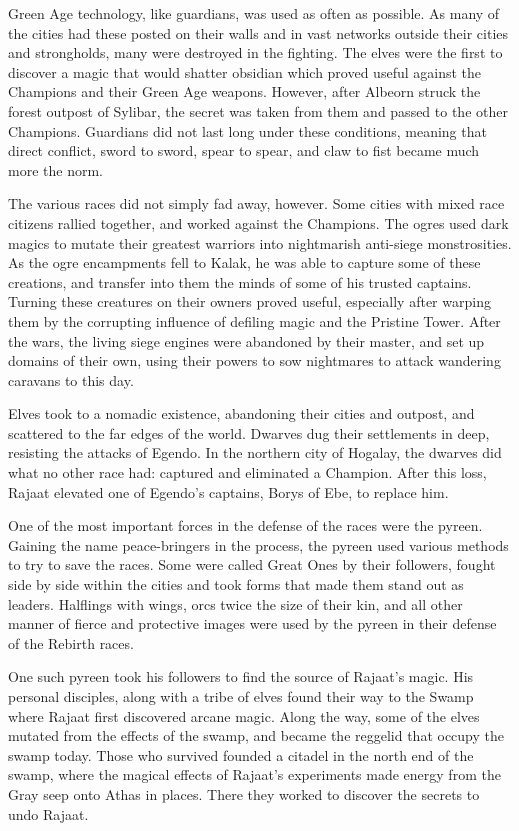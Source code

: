 Green Age technology, like guardians, was used as often as possible. As many of the cities had these posted on their walls and in vast networks outside their cities and strongholds, many were destroyed in the fighting. The elves were the first to discover a magic that would shatter obsidian which proved useful against the Champions and their Green Age weapons. However, after Albeorn struck the forest outpost of Sylibar, the secret was taken from them and passed to the other Champions. Guardians did not last long under these conditions, meaning that direct conflict, sword to sword, spear to spear, and claw to fist became much more the norm.

The various races did not simply fad away, however. Some cities with mixed race citizens rallied together, and worked against the Champions. The ogres used dark magics to mutate their greatest warriors into nightmarish anti-siege monstrosities. As the ogre encampments fell to Kalak, he was able to capture some of these creations, and transfer into them the minds of some of his trusted captains. Turning these creatures on their owners proved useful, especially after warping them by the corrupting influence of defiling magic and the Pristine Tower. After the wars, the living siege engines were abandoned by their master, and set up domains of their own, using their powers to sow nightmares to attack wandering caravans to this day.

Elves took to a nomadic existence, abandoning their cities and outpost, and scattered to the far edges of the world. Dwarves dug their settlements in deep, resisting the attacks of Egendo. In the northern city of Hogalay, the dwarves did what no other race had: captured and eliminated a Champion. After this loss, Rajaat elevated one of Egendo's captains, Borys of Ebe, to replace him.

One of the most important forces in the defense of the races were the pyreen. Gaining the name peace-bringers in the process, the pyreen used various methods to try to save the races. Some were called Great Ones by their followers, fought side by side within the cities and took forms that made them stand out as leaders. Halflings with wings, orcs twice the size of their kin, and all other manner of fierce and protective images were used by the pyreen in their defense of the Rebirth races.

One such pyreen took his followers to find the source of Rajaat's magic. His personal disciples, along with a tribe of elves found their way to the Swamp where Rajaat first discovered arcane magic. Along the way, some of the elves mutated from the effects of the swamp, and became the reggelid that occupy the swamp today. Those who survived founded a citadel in the north end of the swamp,
where the magical effects of Rajaat's experiments made energy from the Gray seep onto Athas in places. There they worked to discover the secrets to undo Rajaat.

